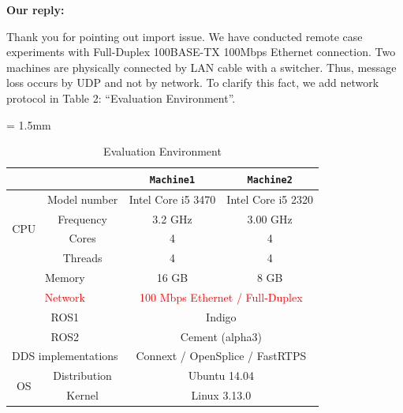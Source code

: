 \documentclass{article}
\begin{document}
\begin{enumerate}
  \begin{flushleft}
    \textbf{Our reply:}
  \end{flushleft}
  Thank you for pointing out import issue. 
  We have conducted remote case experiments with Full-Duplex 100BASE-TX 100Mbps Ethernet connection.
  Two machines are physically connected by LAN cable with a switcher.
  Thus, message loss occurs by UDP and not by network.
  To clarify this fact, we add network protocol in Table 2: ``Evaluation Environment''.
  \clearpage
  \setcounter{table}{1}
  \begin{table}[t]
    \caption{Evaluation Environment}
    \centering
    \begin{threeparttable}
      \renewcommand{\arraystretch}{1.0}
      \label{tb:environment}
      \small
      \tabcolsep = 1.5mm              %
      \begin{tabular}{c|c||c|c}
        \hline
        \multicolumn{2}{c||}{ } & \textbf{\texttt{Machine1}} & \textbf{\texttt{Machine2}} \\ \hline \hline
        \multirow{4}{*}{CPU}   & Model number & Intel Core i5 3470 & Intel Core i5 2320 \\ 
        & Frequency & 3.2 GHz & 3.00 GHz \\ 
        & Cores & 4 & 4 \\ 
        & Threads & 4 & 4 \\ \hline
        \multicolumn{2}{c||}{Memory} & 16 GB & 8 GB \\ \hline 
        \multicolumn{2}{c||}{\textcolor{red}{Network}} & \multicolumn{2}{c}{\textcolor{red}{100 Mbps Ethernet / Full-Duplex}} \\ \hline
        \multicolumn{2}{c||}{ROS1} & \multicolumn{2}{c}{Indigo} \\ 
        \multicolumn{2}{c||}{ROS2} & \multicolumn{2}{c}{Cement (alpha3)} \\ 
        \multicolumn{2}{c||}{DDS implementations} & \multicolumn{2}{c}{Connext\tnote{1} / OpenSplice\tnote{2} / FastRTPS } \\ \hline 
        \multirow{2}{*}{OS} & Distribution & \multicolumn{2}{c}{Ubuntu 14.04} \\ 
        & Kernel & \multicolumn{2}{c}{Linux 3.13.0} \\ \hline
      \end{tabular}
    \end{threeparttable}
  \end{table}
    

\end{enumerate}
\end{document}
